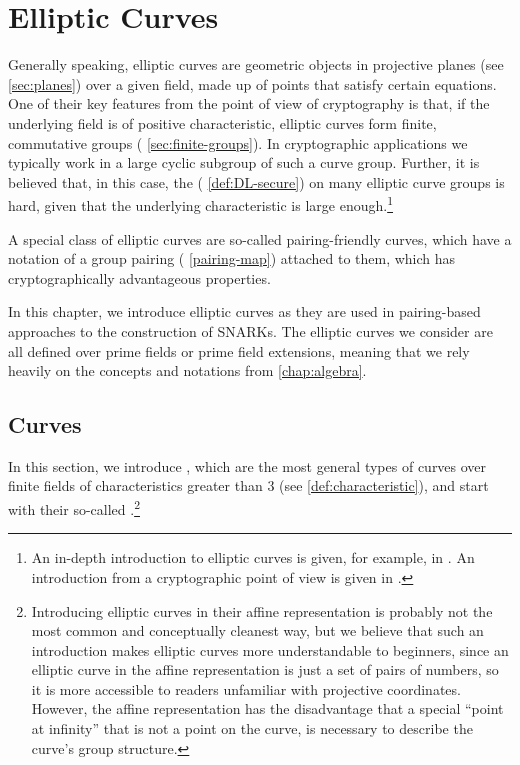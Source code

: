 \chapter{Elliptic Curves}\label{chap:elliptic-curves}
\label{chap:elliptic_curves}
Generally speaking, elliptic curves are geometric objects in projective planes (see \secname{} \ref{sec:planes}) over a given field, made up of points that satisfy certain equations. One of their key features from the point of view of cryptography is that, if the underlying field is of positive characteristic, elliptic curves form finite, commutative groups (\secname{} \ref{sec:finite-groups}). In cryptographic applications we typically work in a large cyclic subgroup of such a curve group. Further, it is believed that, in this case, the  (\secname{} \ref{def:DL-secure}) on many elliptic curve groups is hard, given that the underlying characteristic is large enough.\footnote{An in-depth introduction to elliptic curves is given, for example, in \cite{silverman-1994}. An introduction from a cryptographic point of view is given in \cite{hoffstein-2008}.}

A special class of elliptic curves are so-called pairing-friendly curves, which have a notation of a group pairing (\secname{} \ref{pairing-map}) attached to them, which has cryptographically advantageous properties. 

In this chapter, we introduce elliptic curves as they are used in pairing-based approaches to the construction of SNARKs. The elliptic curves we consider are all defined over prime fields or prime field extensions, meaning that we rely heavily on the concepts and notations from \chaptname{} \ref{chap:algebra}. 

\section{ Curves}
\label{sec:short_weierstrass_curve}
In this section, we introduce , which are the most general types of curves over finite fields of characteristics greater than $3$ (see \chaptname{} \ref{def:characteristic}), and start with their so-called .\footnote{Introducing elliptic curves in their affine representation is probably not the most common and conceptually cleanest way, but we believe that such an introduction makes elliptic curves more understandable to beginners, since an elliptic curve in the affine representation is just a set of pairs of numbers, so it is more accessible to readers unfamiliar with projective coordinates. However, the affine representation has the disadvantage that a special ``point at infinity'' that is not a point on the curve, is necessary to describe the curve's group structure.}

